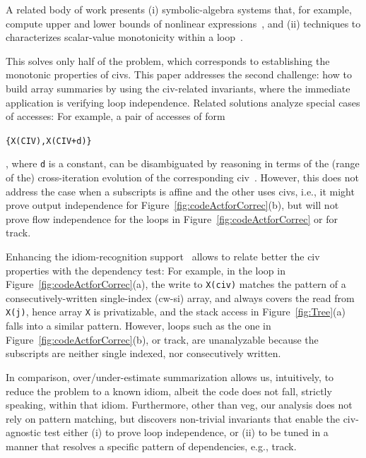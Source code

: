 \documentclass{sig-alternate}
\begin{document}
A related  body of work presents (i) symbolic-algebra systems that, for example,  
compute upper and lower bounds of nonlinear expressions~\cite{Fahringer97EffSymb},
and (ii) techniques to characterizes scalar-value monotonicity within a 
loop~\cite{VEG,MonStmt}.

This solves only half of the problem, which   
corresponds to establishing the monotonic properties of {\sc civ}s.
This paper addresses the second challenge: 
how to build array summaries by using the {\sc civ}-related invariants,
where the immediate application is verifying loop independence. 
Related solutions analyze special cases of accesses:
%
For example, a pair of accesses of form  
\begin{small}{\tt\{X(CIV),X(CIV+d)\}}\end{small}, where {\tt d} is a constant,
can be disambiguated by reasoning in terms of the
(range of the) cross-iteration evolution of the corresponding {\sc civ}~\cite{CohenBeyondMon}.
%
However, this does not address the case when a subscripts is affine
and the other uses {\sc civ}s, i.e., it might prove output 
independence for Figure~\ref{fig:codeActforCorrec}(b),
but will not prove flow independence for the loops in 
Figure~\ref{fig:codeActforCorrec} %
or for {\sc track}. %

Enhancing the idiom-recognition support~\cite{PaduaStackArr,PaduaDemDrInterproc} 
allows to relate better the {\sc civ} properties with the dependency test: 
For example, in the loop in Figure~\ref{fig:codeActforCorrec}(a), the write to 
{\tt X(civ)} matches the pattern of a consecutively-written single-index ({\sc cw-si}) 
array, and always covers the read from {\tt X(j)}, hence array {\tt X} is privatizable,
and the stack access in Figure~\ref{fig:Tree}(a) falls into a similar pattern.
%
%
However, loops such as the one in Figure~\ref{fig:codeActforCorrec}(b),
or {\sc track}, are unanalyzable because 
the subscripts are neither single indexed, nor consecutively written.  

In comparison, over/under-estimate summarization allows us,
intuitively, to reduce the problem to a known idiom, albeit
the code does not fall, strictly speaking, within that idiom.
Furthermore, other than {\sc veg}, our analysis does not rely
on pattern matching, but discovers non-trivial invariants that
enable the {\sc civ}-agnostic test either (i) to prove loop independence,
or (ii) to be tuned in a manner that resolves a specific pattern 
of dependencies, e.g., {\sc track}.
\end{document}
